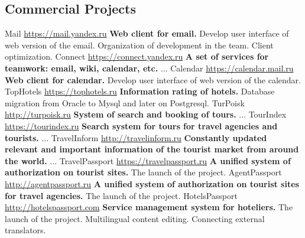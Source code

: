 \documentclass[11pt,a4paper]{moderncv}
\begin{document}
  \subsection{Commercial Projects}
  \cvline
    {Mail}
    {\url{https://mail.yandex.ru}\newline{}
    \textbf{Web client for email.}\newline{}
    Develop user interface of web version of the email.\newline{}
    Organization of development in the team.\newline{}
    Client optimization.}
  \cvline
    {Connect}
    {\url{https://connect.yandex.ru}\newline{}
    \textbf{A set of services for teamwork: email, wiki, calendar, etc.}\newline{}
    ...}
  \cvline
    {Calendar}
    {\url{https://calendar.mail.ru}\newline{}
    \textbf{Web client for calendar.}\newline{}
    Develop user interface of web version of the calendar.}
  \cvline
    {TopHotels}
    {\url{https://tophotels.ru}\newline{}
    \textbf{Information rating of hotels.}\newline{}
    Database migration from Oracle to Mysql and later on Postgresql.}
  \cvline
    {TurPoisk}
    {\url{http://turpoisk.ru}\newline{}
    \textbf{System of search and booking of tours.}\newline{}
    ...}
  \cvline
    {TourIndex}
    {\url{https://tourindex.ru}\newline{}
    \textbf{Search system for tours for travel agencies and tourists.}\newline{}
    ...}
  \cvline
    {TravelInform}
    {\url{http://travelinform.ru}\newline{}
    \textbf{Constantly updated relevant and important information of the tourist market from around the world.}\newline{}
    ...}
  \cvline
    {TravelPassport}
    {\url{https://travelpassport.ru}\newline{}
    \textbf{A unified system of authorization on tourist sites.}\newline{}
    The launch of the project.}
  \cvline
    {AgentPassport}
    {\url{http://agentpassport.ru}\newline{}
    \textbf{A unified system of authorization on tourist sites for travel agencies.}\newline{}
    The launch of the project.}
  \cvline
    {HotelsPassport}
    {\url{http://hotelspassport.com}\newline{}
    \textbf{Service management system for hoteliers.}\newline{}
    The launch of the project.\newline{}
    Multilingual content editing. Connecting external translators.}
\end{document}
